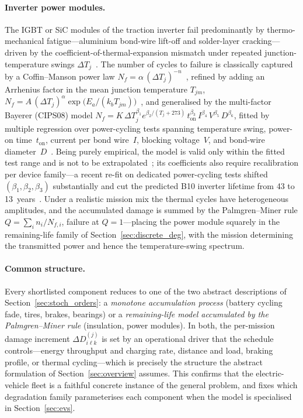 \documentclass[11pt,a4paper]{article}
\theoremstyle{plain}
\theoremstyle{definition}
\theoremstyle{remark}
\begin{document}
\paragraph{Inverter power modules.}
The IGBT or SiC modules of the traction inverter fail predominantly by thermo-mechanical fatigue---aluminium bond-wire lift-off and solder-layer cracking---driven by the coefficient-of-thermal-expansion mismatch under repeated junction-temperature swings $\Delta T_j$~\cite[Sec.~1]{Bayerer2008}.
The number of cycles to failure is classically captured by a Coffin--Manson power law $N_f = \alpha\,(\Delta T_j)^{-n}$~\cite[Eq.~3]{Alavi2024}, refined by adding an Arrhenius factor in the mean junction temperature $T_{jm}$, $N_f = A\,(\Delta T_j)^{\alpha}\exp\!\bigl(E_a/(k_b T_{jm})\bigr)$~\cite[Eq.~4]{Alavi2024}, and generalised by the multi-factor Bayerer (CIPS08) model
$N_f = K\,\Delta T_j^{\beta_1} e^{\beta_2/(T_{j}+273)}\, t_{\mathrm{on}}^{\beta_3}\, I^{\beta_4}\, V^{\beta_5}\, D^{\beta_6}$,
fitted by multiple regression over power-cycling tests spanning temperature swing, power-on time~$t_{\mathrm{on}}$, current per bond wire~$I$, blocking voltage~$V$, and bond-wire diameter~$D$~\cite[Eq.~1]{Bayerer2008}.
Being purely empirical, the model is valid only within the fitted test range and is not to be extrapolated~\cite[Sec.~3.1]{Bayerer2008}; its coefficients also require recalibration per device family---a recent re-fit on dedicated power-cycling tests shifted $(\beta_1,\beta_2,\beta_3)$ substantially and cut the predicted B10 inverter lifetime from 43 to 13~years~\cite[Abstract and Sec.~5]{Alavi2024}.
Under a realistic mission mix the thermal cycles have heterogeneous amplitudes, and the accumulated damage is summed by the Palmgren--Miner rule $Q = \sum_i n_i/N_{f,i}$, failure at $Q=1$---placing the power module squarely in the remaining-life family of Section~\ref{sec:discrete_deg}, with the mission determining the transmitted power and hence the temperature-swing spectrum.

\paragraph{Common structure.}
Every shortlisted component reduces to one of the two abstract descriptions of Section~\ref{sec:stoch_orders}: a \emph{monotone accumulation process} (battery cycling fade, tires, brakes, bearings) or a \emph{remaining-life model accumulated by the Palmgren--Miner rule} (insulation, power modules).
In both, the per-mission damage increment $\Delta D^{(j)}_{i\ell k}$ is set by an operational driver that the schedule controls---energy throughput and charging rate, distance and load, braking profile, or thermal cycling---which is precisely the structure the abstract formulation of Section~\ref{sec:overview} assumes.
This confirms that the electric-vehicle fleet is a faithful concrete instance of the general problem, and fixes which degradation family parameterises each component when the model is specialised in Section~\ref{sec:evs}.
\end{document}
